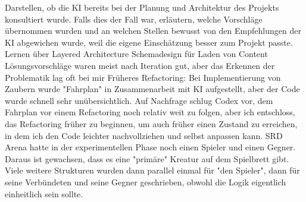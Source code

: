 {}\markdownRendererParagraphSeparator
{}\markdownRendererInterblockSeparator
{}
\markdownRendererSectionEnd \markdownRendererSectionBegin
{}\markdownRendererInterblockSeparator
{}\markdownRendererBlockQuoteBegin
{} Darstellen, ob die KI bereits bei der Planung und Architektur des Projekts konsultiert wurde. Falls dies der Fall war, erläutern, welche Vorschläge übernommen wurden und an welchen Stellen bewusst von den Empfehlungen der KI abgewichen wurde, weil die eigene Einschätzung besser zum Projekt passte.\markdownRendererBlockQuoteEnd \markdownRendererInterblockSeparator
{}\markdownRendererUlBeginTight
\markdownRendererUlItem Lernen über Layered Architecture\markdownRendererUlItemEnd 
\markdownRendererUlItem Schemadesign für Laden von Content\markdownRendererUlItemEnd 
\markdownRendererUlItem Lösungsvorschläge waren meist nach Iteration gut, aber das Erkennen der Problematik lag oft bei mir\markdownRendererUlItemEnd 
\markdownRendererUlEndTight \markdownRendererInterblockSeparator
{}\markdownRendererOlBeginTight
{}Früheres Refactoring: Bei Implementierung von Zaubern wurde "Fahrplan" in Zusammenarbeit mit KI aufgestellt, aber der Code wurde schnell sehr unübersichtlich. Auf Nachfrage schlug Codex vor, dem Fahrplan vor einem Refactoring noch relativ weit zu folgen, aber ich entschloss, das Refactoring früher zu beginnen, um auch früher einen Zustand zu erreichen, in dem ich den Code leichter nachvollziehen und selbst anpassen kann.\markdownRendererOlItemEnd 
{}SRD Arena hatte in der experimentellen Phase noch einen Spieler und einen Gegner. Daraus ist gewachsen, dass es eine "primäre" Kreatur auf dem Spielbrett gibt. Viele weitere Strukturen wurden dann parallel einmal für "den Spieler", dann für seine Verbündeten und seine Gegner geschrieben, obwohl die Logik eigentlich einheitlich sein sollte.\markdownRendererOlItemEnd 
